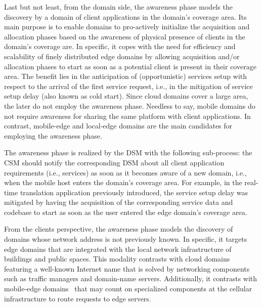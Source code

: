 
Last but not least, from the domain side, the awareness phase models the discovery by a domain of client applications in the domain's coverage area. Its main purpose is to enable domains to pro-actively initialize the acquisition and allocation phases based on the awareness of physical presence of clients in the domain's coverage are. In specific, it copes with the need for efficiency and scalability of finely distributed edge domains by allowing acquisition and/or allocation phases to start as soon as a potential client is present in their coverage area. The benefit lies in the anticipation of (opportunistic) services setup with respect to the arrival of the first service request, i.e., in the mitigation of service setup delay (also known as cold start). Since cloud domains cover a large area, the later do not employ the awareness phase. Needless to say, mobile domains do not require awareness for sharing the same platform with client applications. In contrast, mobile-edge and local-edge domains are the main candidates for employing the awareness phase. 

The awareness phase is realized by the DSM with the following sub-process: the CSM should notify the corresponding DSM about all client application requirements (i.e., services) as soon as it becomes aware of a new domain, i.e., when the mobile host enters the domain's coverage area. For example, in the real-time translation application previously introduced, the service setup delay was mitigated by having the acquisition of the corresponding service data and codebase to start as soon as the user entered the edge domain's coverage area.

From the clients perspective, the awareness phase models the discovery of domains whose network address is not previously known. In specific, it targets edge domains that are integrated with the local network infrastructure of buildings and public spaces. This modality contrasts with cloud domains featuring a well-known Internet name that is solved by networking components such as traffic managers and domain-name servers. Additionally, it contrasts with mobile-edge domains~\cite{} that may count on specialized components at the cellular infrastructure to route requests to edge servers. 

